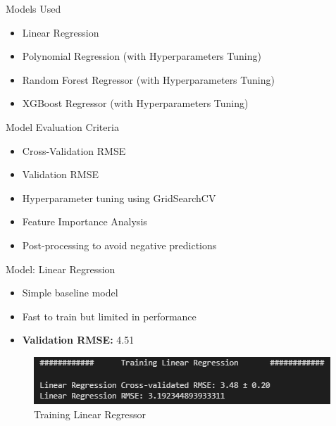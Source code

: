\documentclass{beamer}
\begin{document}

\begin{frame}{Models Used}
\begin{itemize}
    \item Linear Regression
    \item Polynomial Regression (with Hyperparameters Tuning)
    \item Random Forest Regressor (with Hyperparameters Tuning)
    \item XGBoost Regressor (with Hyperparameters Tuning)
\end{itemize}
\end{frame}

\begin{frame}{Model Evaluation Criteria}
\begin{itemize}
    \item Cross-Validation RMSE
    \item Validation RMSE
    \item Hyperparameter tuning using GridSearchCV
    \item Feature Importance Analysis
    \item Post-processing to avoid negative predictions
\end{itemize}
\end{frame}
    
\begin{frame}{Model: Linear Regression}
  \begin{itemize}
    \item Simple baseline model
    \item Fast to train but limited in performance
    \item \textbf{Validation RMSE:} 4.51
  \end{itemize}
\begin{figure}
\vfill
    \centering
    \includegraphics[width=0.6\linewidth]{images/lr.png}
    \caption{Training Linear Regressor}
    \label{fig:enter-label}
\end{figure}
\end{frame}
\end{document}
